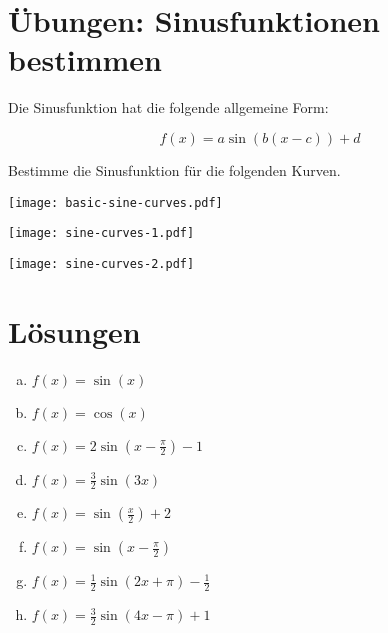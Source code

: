 \documentclass[DIV=17]{scrartcl}
\begin{document}
\section*{Übungen: Sinusfunktionen bestimmen}

Die Sinusfunktion hat die folgende allgemeine Form:

\begin{equation}
    f(x) = a \sin(b(x - c)) + d
\end{equation}

\vspace*{3mm}

\noindent
Bestimme die Sinusfunktion für die folgenden Kurven.

\vspace*{5mm}

\texttt{[image: basic-sine-curves.pdf]}

\vspace*{10mm}

\texttt{[image: sine-curves-1.pdf]}

\vspace*{10mm}

\texttt{[image: sine-curves-2.pdf]}

\newpage

\section*{Lösungen}

\begin{enumerate}[(a)]
    \item $f(x) = \sin(x)$
    \item $f(x) = \cos(x)$
    \item $f(x) = 2 \sin(x - \frac{\pi}{2}) - 1$
    \item $f(x) = \frac{3}{2} \sin(3 x)$
    \item $f(x) = \sin(\frac{x}{2}) + 2$
    \item $f(x) = \sin(x -\frac{\pi}{2})$
    \item $f(x) = \frac{1}{2} \sin(2 x + \pi) - \frac{1}{2}$
    \item $f(x) = \frac{3}{2} \sin(4 x - \pi) + 1$
\end{enumerate}
\end{document}
